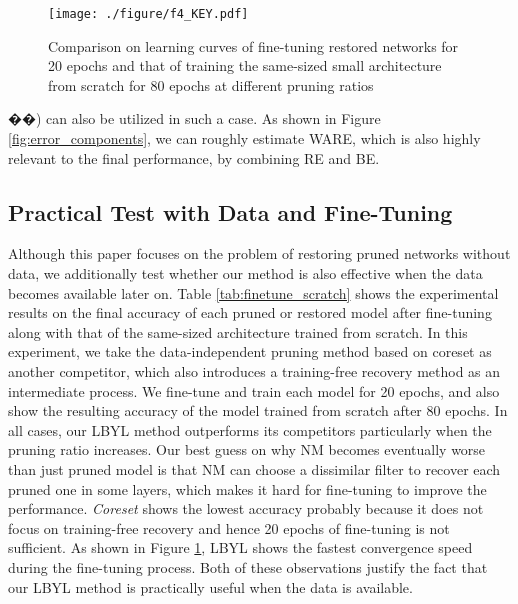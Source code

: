 \begin{figure}[t]
	\centering 
	\texttt{[image: ./figure/f4\_KEY.pdf]} \\
    \caption{Comparison on learning curves of fine-tuning restored networks for 20 epochs and that of training the same-sized small architecture from scratch for 80 epochs at different pruning ratios}
	\label{fig:Fine tuning and From Scratch}
 	\vspace{-2mm}
\end{figure}

��) can also be utilized in such a case. As shown in Figure \ref{fig:error_components}, we can roughly estimate WARE, which is also highly relevant to the final performance, by combining RE and BE.

\subsection{Practical Test with Data and Fine-Tuning}
Although this paper focuses on the problem of restoring pruned networks without data, we additionally test whether our method is also effective when the data becomes available later on. Table \ref{tab:finetune_scratch} shows the experimental results on the final accuracy of each pruned or restored model after fine-tuning along with that of the same-sized architecture trained from scratch. In this experiment, we take the data-independent pruning method based on coreset \cite{CoreSet_ICLR} as another competitor, which also introduces a training-free recovery method as an intermediate process. We fine-tune and train each model for 20 epochs, and also show the resulting accuracy of the model trained from scratch after 80 epochs. In all cases, our LBYL method outperforms its competitors particularly when the pruning ratio increases. Our best guess on why NM becomes eventually worse than just pruned model is that NM can choose a dissimilar filter to recover each pruned one in some layers, which makes it hard for fine-tuning to improve the performance.
\textit{Coreset} \cite{CoreSet_ICLR} shows the lowest accuracy probably because it does not focus on training-free recovery and hence 20 epochs of fine-tuning is not sufficient. As shown in Figure \ref{fig:Fine tuning and From Scratch}, LBYL shows the fastest convergence speed during the fine-tuning process. Both of these observations justify the fact that our LBYL method is practically useful when the data is available. 


